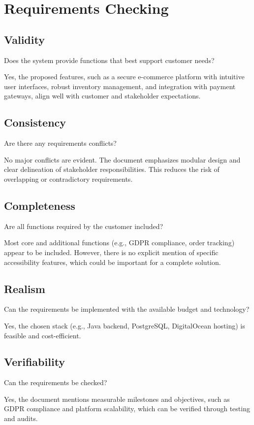 \documentclass[twoside,a4paper,journal]{IEEEtran}
\begin{document}
\section{Requirements Checking}
\subsection{Validity}
\begin{displayquote}
  Does the system provide functions that best support customer needs?
\end{displayquote}
Yes, the proposed features, such as a secure e-commerce platform with intuitive
user interfaces, robust inventory management, and integration with payment
gateways, align well with customer and stakeholder expectations.

\subsection{Consistency}
\begin{displayquote}
  Are there any requirements conflicts?
\end{displayquote}
No major conflicts are evident.
The document emphasizes modular design and clear delineation of stakeholder
responsibilities.
This reduces the risk of overlapping or contradictory requirements.

\subsection{Completeness}
\begin{displayquote}
  Are all functions required by the customer included?
\end{displayquote}
Most core and additional functions (e.g., GDPR compliance, order tracking)
appear to be included.
However, there is no explicit mention of specific accessibility features, which
could be important for a complete solution.

\subsection{Realism}
\begin{displayquote}
  Can the requirements be implemented with the available budget and technology?
\end{displayquote}
Yes, the chosen stack (e.g., Java backend, PostgreSQL, DigitalOcean hosting) is
feasible and cost-efficient.

\subsection{Verifiability}
\begin{displayquote}
  Can the requirements be checked?
\end{displayquote}
Yes, the document mentions measurable milestones and objectives, such as GDPR
compliance and platform scalability, which can be verified through testing and
audits.
\end{document}
